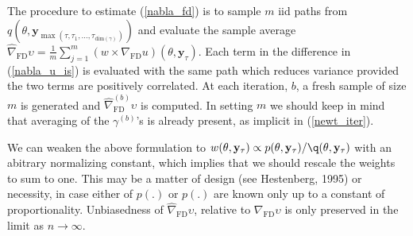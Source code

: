 \documentclass[11pt]{article}
\begin{document}
The procedure to estimate (\ref{nabla_fd}) is to sample $m$ iid paths from $q(\theta,\mathbf{y}_{\max(\tau,\tau_1,...,\tau_{\mathrm{dim}(\gamma)})})$ and evaluate the sample average $\widehat\nabla_{\mathrm{FD}}\upsilon=\frac{1}{m}\sum_{j=1}^m (w\times\nabla_{\mathrm{FD}}u)(\theta,\mathbf{y}_{\tau})$.
Each term in the difference in (\ref{nabla_u_is}) is evaluated with the same path which reduces variance provided the two terms are positively correlated. At each iteration, $b$, a fresh sample of size $m$ is generated and $\hat \nabla_{\mathrm{FD}}^{(b)}\upsilon$ is computed. In setting $m$ we should keep in mind that averaging of the $\gamma^{(b)}$'s is already present, as implicit in (\ref{newt_iter}). 

We can weaken the above formulation to $w(\theta,\mathbf{y}_{\tau})\propto p(\theta,\mathbf{y}_\tau)/\q(\theta,\mathbf{y}_\tau)$ with an abitrary normalizing constant, which implies that we should rescale the weights to sum to one. This may be a matter of design (see Hestenberg, 1995) or necessity, in case either of $p(.)$ or $p(.)$ are known only up to a constant of proportionality. Unbiasedness of $\hat \nabla_{\mathrm{FD}}\upsilon$, relative to $\nabla_{\mathrm{FD}}\upsilon$ is only preserved in the limit as $n\rightarrow \infty$.
\end{document}
